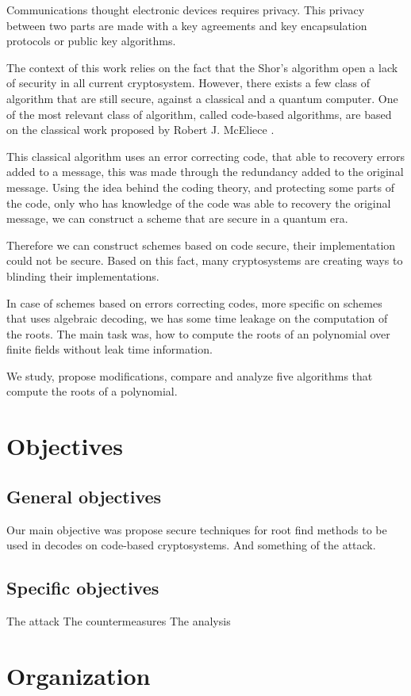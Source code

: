 Communications thought electronic devices requires privacy. This privacy between two parts are made with a key agreements and key encapsulation protocols or public key algorithms. 

The context of this work relies on the fact that the Shor's algorithm open a lack of security in all current cryptosystem. However, there exists a few class of algorithm that are still secure, against a classical and a quantum computer. One of the most relevant class of algorithm, called code-based algorithms, are based on the classical work proposed by Robert J. McEliece \cite{mceliece1978public}. 

This classical algorithm uses an error correcting code, that able to recovery errors added to a message, this was made through the redundancy added to the original message. Using the idea behind the coding theory, and protecting some parts of the code, only who has knowledge of the code was able to recovery the original message, we can construct a scheme that are secure in a quantum era.

Therefore we can construct schemes based on code secure, their implementation could not be secure. Based on this fact, many cryptosystems are creating ways to blinding their implementations. 

In case of schemes based on errors correcting codes, more specific on schemes that uses algebraic decoding, we has some time leakage on the computation of the roots. The main task was, how to compute the roots of an polynomial over finite fields without leak time information. 

We study, propose modifications, compare and analyze five algorithms that compute the roots of a polynomial.


\section{Objectives}

\subsection{General objectives}
Our main objective was propose secure techniques for root find methods to be used in decodes on code-based cryptosystems. And something of the attack.
\subsection{Specific objectives}
The attack
The countermeasures
The analysis
\section{Organization}
